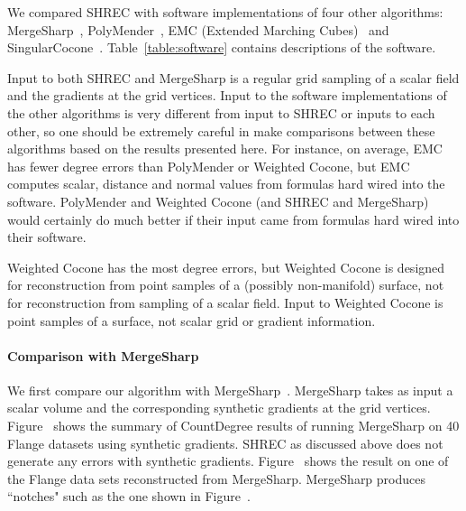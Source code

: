 We compared SHREC with software implementations of four other algorithms:
MergeSharp~\cite{bw-cisec-13,bw-erm-13}, 
PolyMender~\cite{j-rrpm-04}, 
EMC (Extended Marching Cubes)~\cite{kbsh-fssev-01} 
and SingularCocone~\cite{Dey2012}.
Table~\ref{table:software} contains descriptions of the software.

Input to both SHREC and MergeSharp is a regular grid sampling
of a scalar field and the gradients at the grid vertices.
Input to the software implementations of the other algorithms
is very different from input to SHREC or inputs to each other,
so one should be extremely careful in make comparisons
between these algorithms based on the results presented here.
For instance, on average,
EMC has fewer degree errors
than PolyMender or Weighted Cocone,
but EMC computes scalar, 
distance and normal values from formulas hard wired into the software.
PolyMender and Weighted Cocone (and SHREC and MergeSharp)
would certainly do much better if their input came
from formulas hard wired into their software.

Weighted Cocone has the most degree errors,
but Weighted Cocone is designed for reconstruction 
from point samples of a (possibly non-manifold) surface,
not for reconstruction from sampling of a scalar field.
Input to Weighted Cocone is point samples of a surface,
not scalar grid or gradient information.


\paragraph{Comparison with MergeSharp}


We first compare our algorithm with
MergeSharp~\cite{bw-cisec-13}. MergeSharp takes as input a scalar
volume and the corresponding synthetic gradients at the grid
vertices. Figure~\protect{} shows the summary
of CountDegree results of running MergeSharp on 40 Flange datasets
using synthetic gradients. SHREC as discussed above does not generate
any errors with synthetic
gradients. Figure~\protect{} shows the result
on one of the Flange data sets reconstructed from
MergeSharp. MergeSharp produces ``notches" such as the one shown in
Figure~\protect{}.


